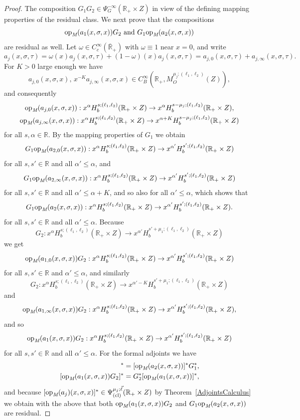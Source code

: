 \documentclass[reqno]{amsart}
\numberwithin{equation}{section}
\theoremstyle{definition}
\def\R{\mathbb R}
\def\opm{\textup{op}_{\textit{M}}}
\begin{document}
\begin{proof}
The composition $G_1G_2 \in \Psi^{-\infty}_G(\R_+\times Z)$ in view of the defining mapping properties of the residual class. We next prove that the compositions
$$
\opm(a_1(x,\sigma,x))G_2 \textup{ and } G_1\opm(a_2(x,\sigma,x))
$$
are residual as well. Let $\omega \in C_c^{\infty}(\overline{\R}_+)$ with $\omega \equiv 1$ near $x=0$, and write
$$
a_j(x,\sigma,\tau) = \omega(x) a_j(x,\sigma,\tau) + (1-\omega)(x) a_j(x,\sigma,\tau) = a_{j,0}(x,\sigma,\tau) + a_{j,\infty}(x,\sigma,\tau).
$$
For $K > 0$ large enough we have
$$
a_{j,0}(x,\sigma,x),\, x^{-K}a_{j,\infty}(x,\sigma,x) \in C^{\infty}_B(\R_+,M^{\mu_j;(\ell_1,\ell_2)}_O(Z)),
$$
and consequently
\begin{gather*}
\opm(a_{j,0}(x,\sigma,x)) : x^{\alpha}H^{s;(\ell_1,\ell_2)}_b(\R_+\times Z) \to x^{\alpha}H^{s-\mu_j;(\ell_1,\ell_2)}_b(\R_+\times Z), \\
\opm(a_{j,\infty}(x,\sigma,x)) : x^{\alpha}H^{s;(\ell_1,\ell_2)}_b(\R_+\times Z) \to x^{\alpha+K}H^{s-\mu_j;(\ell_1,\ell_2)}_b(\R_+\times Z)
\end{gather*}
for all $s,\alpha \in \R$. By the mapping properties of $G_1$ we obtain
$$
G_1 \opm(a_{2,0}(x,\sigma,x)) : x^{\alpha}H^{s;(\ell_1,\ell_2)}_b(\R_+\times Z) \to x^{\alpha'}H^{s';(\ell_1,\ell_2)}_b(\R_+\times Z)
$$
for all $s,s' \in \R$ and all $\alpha' \leq \alpha$, and
$$
G_1 \opm(a_{2,\infty}(x,\sigma,x)) : x^{\alpha}H^{s;(\ell_1,\ell_2)}_b(\R_+\times Z) \to x^{\alpha'}H^{s';(\ell_1,\ell_2)}_b(\R_+\times Z)
$$
for all $s,s' \in \R$ and all $\alpha' \leq \alpha + K$, and so also for all $\alpha' \leq \alpha$, which shows that
$$
G_1 \opm(a_{2}(x,\sigma,x)) : x^{\alpha}H^{s;(\ell_1,\ell_2)}_b(\R_+\times Z) \to x^{\alpha'}H^{s';(\ell_1,\ell_2)}_b(\R_+\times Z).
$$
for all $s,s' \in \R$ and all $\alpha' \leq \alpha$. Because
$$
G_2 : x^{\alpha}H^{s;(\ell_1,\ell_2)}_b(\R_+\times Z) \to x^{\alpha'}H^{s'+\mu_1;(\ell_1,\ell_2)}_b(\R_+\times Z)
$$
we get
$$
\opm(a_{1,0}(x,\sigma,x))G_2 : x^{\alpha}H^{s;(\ell_1,\ell_2)}_b(\R_+\times Z) \to x^{\alpha'}H^{s';(\ell_1,\ell_2)}_b(\R_+\times Z)
$$
for all $s,s'  \in \R$ and $\alpha' \leq \alpha$, and similarly
$$
G_2 : x^{\alpha}H^{s;(\ell_1,\ell_2)}_b(\R_+\times Z) \to x^{\alpha'-K}H^{s'+\mu_1;(\ell_1,\ell_2)}_b(\R_+\times Z)
$$
and
$$
\opm(a_{1,\infty}(x,\sigma,x))G_2 : x^{\alpha}H^{s;(\ell_1,\ell_2)}_b(\R_+\times Z) \to x^{\alpha'}H^{s';(\ell_1,\ell_2)}_b(\R_+\times Z),
$$
and so
$$
\opm(a_1(x,\sigma,x))G_2 : x^{\alpha}H^{s;(\ell_1,\ell_2)}_b(\R_+\times Z) \to x^{\alpha'}H^{s';(\ell_1,\ell_2)}_b(\R_+\times Z)
$$
for all $s,s' \in \R$ and all $\alpha' \leq \alpha$. For the formal adjoints we have
\begin{align*}
[G_1\opm(a_2(x,\sigma,x))]^* &= [\opm(a_2(x,\sigma,x))]^*G_1^*, \\
[\opm(a_1(x,\sigma,x))G_2]^* &= G_2^*[\opm(a_1(x,\sigma,x))]^*,
\end{align*}
and because $[\opm(a_j)(x,\sigma,x)]^* \in \Psi^{\mu_j;\vec{\ell}}_{\textup{(cl)}}(\R_+\times Z)$ by Theorem~\ref{AdjointsCalculus} we obtain with the above that both $\opm(a_1(x,\sigma,x))G_2$ and $G_1\opm(a_2(x,\sigma,x))$ are residual.


\end{proof}
\end{document}

